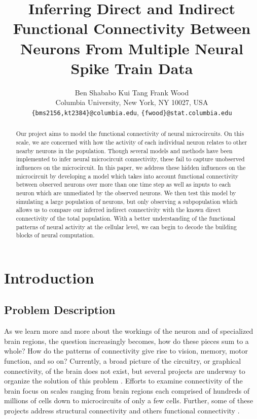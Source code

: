 \documentclass{article}
\title{Inferring Direct and Indirect Functional Connectivity Between Neurons From Multiple Neural Spike Train Data}
\author{
Ben Shababo \hspace{1cm} Kui Tang \hspace{1 cm}Frank Wood\\
Columbia University, New York, NY 10027, USA \\
\texttt{\{bms2156,kt2384\}@columbia.edu},
\texttt{\{fwood\}@stat.columbia.edu} 
}
\begin{document}
\maketitle

\begin{abstract}
Our project aims to model the functional connectivity of neural
microcircuits. On this scale, we are concerned with how the activity
of each individual neuron relates to other nearby neurons in the
population. Though several models and methods have been implemented to infer neural microcircuit connectivity, these fail to capture unobserved influences on the microcircuit. In this paper, we address these hidden influences on the microcircuit by developing a model which takes into account functional connectivity between observed neurons over more than one time step as well as inputs to each neuron which are unmediated by the observed neurons. We then test this model by simulating a large population of neurons, but only observing a subpopulation which allows us to compare our inferred indirect connectivity with the known direct connectivity of the total population. With a better understanding of the functional patterns of neural
activity at the cellular level, we can begin to decode the building
blocks of neural computation.
\end{abstract}

\section{Introduction}
\label{sec:introduction}

\subsection{Problem Description}

As we learn more and more about the workings of the neuron and of
specialized brain regions, the question increasingly becomes, how
do these pieces sum to a whole? How do the patterns of connectivity
give rise to vision, memory, motor function, and so on? Currently, a broad picture of the circuitry, or graphical connectivity,
of the brain does not exist, but several projects are underway to organize the solution of
this problem \citep{Marcus2011, Bohland2009}. Efforts to examine connectivity of the brain focus on scales ranging from brain regions each comprised of hundreds of
millions of cells down to microcircuits of only a few cells. Further,
some of these projects address structural connectivity and others
functional connectivity \citep{KnowlesBarley2011, Jain2010, Ropireddy2011, Chiang2011, bhattacharya2006}.
\end{document}
